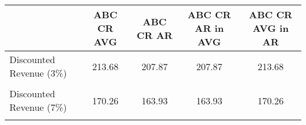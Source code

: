 \begin{tabular}{l*{4}{c}}
\hline\hline
                &ABC CR AVG&ABC CR AR&ABC CR AR in AVG&ABC CR AVG in AR\\
\hline
Discounted Revenue (3\%)&   213.68&   207.87&   207.87&   213.68\\
                &         &         &         &         \\
Discounted Revenue (7\%)&   170.26&   163.93&   163.93&   170.26\\
                &         &         &         &         \\
\hline\hline
\end{tabular}
